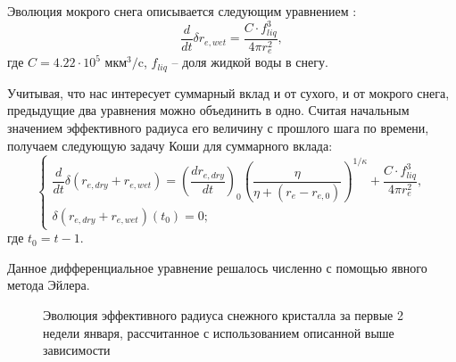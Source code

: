 \documentclass[a4paper, fontsize=14pt]{scrartcl}
\begin{document}
Эволюция мокрого снега описывается следующим уравнением \cite{CLM4.5tech, Brun1989}:
\begin{equation}
\dfrac{d}{dt} \delta r_{e , wet} = \dfrac{C \cdot f_{liq}^3} {4 \pi r_{e}^2}, \label{sys}
\end{equation}
где $C = 4.22 \cdot 10^{5}$ мкм$^3/$c, $f_{liq}$ -- доля жидкой воды в снегу.

Учитывая, что нас интересует суммарный вклад и от сухого, и от мокрого снега, предыдущие два уравнения можно объединить в одно. Считая начальным значением эффективного радиуса его величину с прошлого шага по времени, получаем следующую задачу Коши для суммарного вклада:
\begin{equation}
    \begin{cases}
        \dfrac{d}{dt} \delta (r_{e , dry} + r_{e , wet}) = {\left( \dfrac{dr_{e , dry}}{dt} \right)}_0 \left(\dfrac{\eta}{\eta + (r_e - r_{e, 0})}\right)^{1 / \kappa} + \dfrac{C \cdot f_{liq}^3} {4 \pi r_{e}^2} ,
        \\
        \delta (r_{e , dry} + r_{e , wet})(t_0) = 0; 
    \end{cases} \label{sysRDS2}
\end{equation}
где $t_0 = t - 1$. 

\newpage
Данное дифференциальное уравнение решалось численно с помощью явного метода Эйлера.

\begin{figure}[h]
    \caption{Эволюция эффективного радиуса снежного кристалла за первые 2 недели января, рассчитанное с использованием описанной выше зависимости}
    \label{fig:image}
\end{figure}
 
\end{document}
